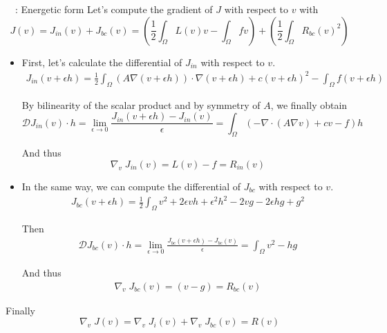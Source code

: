 \begin{frame}[allowframebreaks]{\appendixname~\theappendixframenumber~: Energetic form} 
	Let's compute the gradient of $J$ with respect to $v$ with
	\begin{equation*}
		J(v)=J_{in}(v)+J_{bc}(v)=\left(\frac{1}{2}\int_\Omega L(v)v - \int_\Omega fv\right) + \left(\frac{1}{2}\int_\Omega R_{bc}(v)^2\right)
	\end{equation*}

	\begin{itemize}[\textbullet]
		\item First, let's calculate the differential of $J_{in}$ with respect to $v$.
		\begin{align*}
			J_{in}(v+\epsilon h)=\frac{1}{2} \int_{\Omega} (A\nabla(v+\epsilon h)) \cdot \nabla(v+\epsilon h) + c(v+\epsilon h)^2 - \int_{\Omega} f(v+\epsilon h)
		\end{align*}
		
		By bilinearity of the scalar product and by symmetry of $A$, we finally obtain
		\begin{equation*}
			\mathcal{D}J_{in}(v)\cdot h = \lim_{\epsilon\rightarrow 0}\frac{J_{in}(v+\epsilon h)-J_{in}(v)}{\epsilon} = \int_{\Omega} (-\nabla\cdot(A\nabla v) + cv - f)h
		\end{equation*}
		
		And thus
		\begin{equation*}
			\nabla_v \; J_{in}(v) = L(v) - f = R_{in}(v)
		\end{equation*}
	
		\newpage
		
		\item In the same way, we can compute the differential of $J_{bc}$ with respect to $v$.
		\begin{align*}
			J_{bc}(v+\epsilon h)=\frac{1}{2} \int_{\Omega} v^2+2\epsilon vh +\epsilon^2 h^2 - 2vg - 2\epsilon hg+g^2
		\end{align*}
		
		Then
		\begin{align*}
			\mathcal{D}J_{bc}(v)\cdot h =  \lim_{\epsilon\rightarrow 0}\frac{J_{bc}(v+\epsilon h)-J_{bc}(v)}{\epsilon} = \int_{\Omega} v^2 - hg
		\end{align*}
		
		And thus
		\begin{align*}
			\nabla_v \; J_{bc}(v) = (v-g) = R_{bc}(v) 
		\end{align*}
	\end{itemize}
	
	Finally
	\begin{equation*}
		\nabla_v \; J(v) = \nabla_v \; J_{i}(v) + \nabla_v \; J_{bc}(v) = R(v)
	\end{equation*}
\end{frame}
\addtocounter{appendixframenumber}{1}

